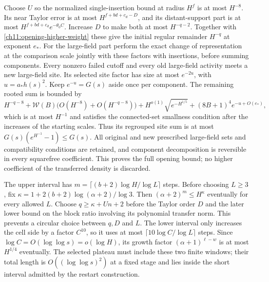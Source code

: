 Choose $U$ so the normalized single-insertion bound at radius $H^f$
is at most $H^{-8}$. Its near Taylor error is at most
$H^{f+bd+c_d-D}$, and its distant-support part is at most
$H^{f+bd+c_d}e^{-\theta_0 C}$. Increase $D$ to make both
at most $H^{-q-2}$. Together with
\eqref{ch11:opening-higher-weight} these give the initial
regular remainder $H^{-q}$ at exponent $e_*$.
For the large-field part perform the exact change of representation at the comparison scale
jointly with these factors with insertions, before summing components.
Every nonzero failed cutoff and every old large-field activity
meets a new large-field site. Its selected site factor has size at
most $e^{-2u}$, with $u=a_*h(s)^2$.
Keep $e^{-u}=G(s)$ aside once per component.
The remaining rooted sum is bounded by
\[
 H^{-q-8}
 +\mathcal W(B)\bigl(O(H^{-8})+O(H^{-q-8})\bigr)
 +H^{o(1)}\sqrt{e^{-H^{1/5}}}
 +(8B+1)^4e^{-u+O(e_*)},
\]
which is at most $H^{-1}$ and satisfies the connected-set
smallness condition after the increases of the starting scales.
Thus its regrouped site sum is at most
$G(s)(e^{H^{-1}}-1)\le G(s)$.
All original and new prescribed large-field sets and compatibility conditions are
retained, and component decomposition is reversible in every
squarefree coefficient. This proves the full opening bound;
no higher coefficient of the transferred density is discarded.

The upper interval has
$m=\lceil(b+2)\log H/\log L\rceil$ steps.
Before choosing $L\ge3$, fix
$\kappa=1+2(b+2)\log(\alpha+2)/\log3$.
Then $(\alpha+2)^m\le H^\kappa$ eventually for every allowed $L$.
Choose $q\ge\kappa+Un+2$ before the Taylor order $D$ and
the later lower bound on the block ratio involving its polynomial transfer norm.
This prevents a circular choice between $q,D$ and $L$.
The lower interval only increases the cell side by a factor
$C^{10}$, so it uses at most
$\lceil10\log C/\log L\rceil$ steps.
Since $\log C=O(\log\log s)=o(\log H)$, its growth factor
$(\alpha+1)^{\ell-w}$ is at most $H^{1/4}$ eventually.
The selected plateau must include these two finite windows;
their total length is $O((\log\log s)^2)$ at a fixed stage
and lies inside the short interval admitted by the restart
construction.

